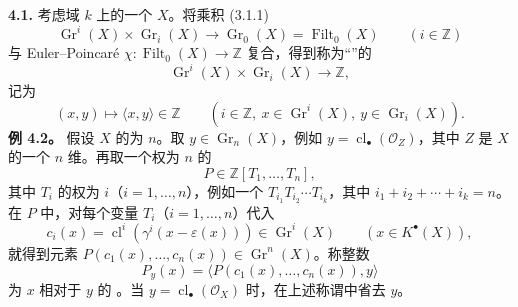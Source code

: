 \textbf{4.1.} 考虑域 $k$ 上的一个 $X$。将乘积 (3.1.1)
\[\operatorname{Gr}^i(X)\times\operatorname{Gr}_i(X)\longrightarrow\operatorname{Gr}_0(X)=\operatorname{Filt}_0(X)\qquad(i\in\mathbb Z)\]
与 Euler--Poincaré  $\chi:\operatorname{Filt}_0(X)\longrightarrow\mathbb Z$ 复合，得到称为“”的
\[\operatorname{Gr}^i(X)\times\operatorname{Gr}_i(X)\longrightarrow\mathbb Z,\tag{4.1.1}\]
记为
\[(x,y)\longmapsto\langle x,y\rangle\in\mathbb Z\qquad(i\in\mathbb Z,\ x\in\operatorname{Gr}^i(X),\ y\in\operatorname{Gr}_i(X)).\]
\textbf{例 4.2。} 假设 $X$ 的为 $n$。取 $y\in\operatorname{Gr}_n(X)$，例如 $y=\operatorname{cl}_\bullet(\mathcal O_Z)$，其中 $Z$ 是 $X$ 的一个 $n$ 维。再取一个权为 $n$ 的
\[P\in\mathbb Z[T_1,\ldots,T_n],\]
其中 $T_i$ 的权为 $i$（$i=1,\ldots,n$），例如一个 $T_{i_1}T_{i_2}\cdots T_{i_k}$，其中 $i_1+i_2+\cdots+i_k=n$。在 $P$ 中，对每个变量 $T_i$（$i=1,\ldots,n$）代入
\[c_i(x)=\operatorname{cl}^i(\gamma^i(x-\varepsilon(x)))\in\operatorname{Gr}^i(X)\qquad(x\in K^\bullet(X)),\]
就得到元素 $P(c_1(x),\ldots,c_n(x))\in\operatorname{Gr}^n(X)$。称整数
\[P_y(x)=\langle P(c_1(x),\ldots,c_n(x)),y\rangle\]
为 $x$ 相对于 $y$ 的 。当 $y=\operatorname{cl}_\bullet(\mathcal O_X)$ 时，在上述称谓中省去 $y$。

